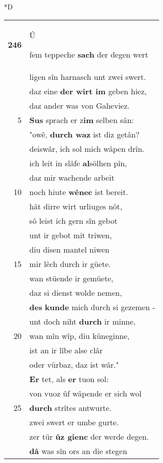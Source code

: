 \documentclass[8pt,a4paper,notitlepage]{article}
\begin{document}
\begin{table}[ht]
\begin{minipage}[t]{0.5\linewidth}
\small
\begin{center}*D
\end{center}
\begin{tabular}{rl}
\textbf{246} & \begin{large}Û\end{large}fem teppeche \textbf{sach} der degen wert\\ 
 & ligen sîn harnasch unt zwei swert.\\ 
 & daz eine \textbf{der wirt im} geben hiez,\\ 
 & daz ander was von Gaheviez.\\ 
5 & \textbf{Sus} sprach er z\textbf{im} selben sân:\\ 
 & "owê, \textbf{durch waz} ist diz getân?\\ 
 & deiswâr, ich sol mich wâpen drîn.\\ 
 & ich leit in slâfe \textbf{al}sölhen pîn,\\ 
 & daz mir wachende arbeit\\ 
10 & noch hiute \textbf{wênec} ist bereit.\\ 
 & hât dirre wirt urliuges nôt,\\ 
 & sô leist ich gern sîn gebot\\ 
 & unt ir gebot mit triwen,\\ 
 & diu disen mantel niwen\\ 
15 & mir lêch durch ir güete.\\ 
 & wan stüende ir gemüete,\\ 
 & daz si dienst wolde nemen,\\ 
 & \textbf{des} \textbf{kunde} mich durch si gezemen -\\ 
 & unt doch niht \textbf{durch} ir minne,\\ 
20 & wan mîn wîp, diu küneginne,\\ 
 & ist an ir lîbe alse clâr\\ 
 & oder vürbaz, daz ist wâr."\\ 
 & \textbf{Er} tet, als \textbf{er} tuon sol:\\ 
 & von vuoz ûf wâpende er sich wol\\ 
25 & \textbf{durch} strîtes antwurte.\\ 
 & zwei swert er umbe gurte.\\ 
 & zer tür \textbf{ûz gienc} der werde degen.\\ 
 & \textbf{dâ} was sîn ors an die stegen\\ 

\end{tabular}
\end{minipage}
\end{table}
\end{document}
